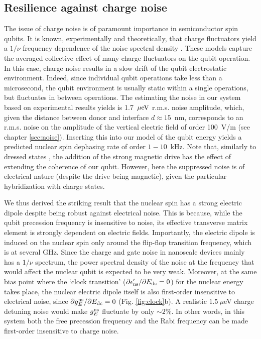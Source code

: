 \subsection{Resilience against charge noise}

The issue of charge noise is of paramount importance in semiconductor spin qubits. It is known, experimentally and theoretically, that charge fluctuators yield a $1/\nu$ frequency dependence of the noise spectral density \cite{Paladino2014}. These models capture the averaged collective effect of many charge fluctuators on the qubit operation. In this case, charge noise results in a slow drift of the qubit electrostatic environment. Indeed, since individual qubit operations take less than a microsecond, the qubit environment is usually static within a single operations, but fluctuates in between operations. The estimating the noise in our system based on experimental results yields is 1.7~${\rm \mu eV}$ r.m.s. noise amplitude, which, given the distance between donor and interface $d \approx 15$~nm, corresponds to an r.m.s. noise on the amplitude of the vertical electric field of order 100~V/m (see chapter \ref{sec:noise}). Inserting this into our model of the qubit energy yields a predicted nuclear spin dephasing rate of order $1-10$~kHz. Note that, similarly to dressed states \cite{London2013,Laucht2016,Laucht2017}, the addition of the strong magnetic drive has the effect of extending the coherence of our qubit. However, here the suppressed noise is of electrical nature (despite the drive being magnetic), given the particular hybridization with charge states.

We thus derived the striking result that the nuclear spin has a strong electric dipole despite being robust against electrical noise. This is because, while the qubit precession frequency is insensitive to noise, its effective transverse matrix element is strongly dependent on electric fields. Importantly, the electric dipole is induced on the nuclear spin  only around the flip-flop transition frequency, which is at several GHz. Since the charge and gate noise in nanoscale devices mainly has a $1/\nu$ spectrum, the power spectral density of the noise at the frequency that would affect the nuclear qubit is expected to be very weak. Moreover, at the same bias point where the `clock transition' ($\partial\epsilon'_{\rm ns}/\partial E_{\rm dc}=0$) for the nuclear energy takes place, the nuclear electric dipole itself is also first-order insensitive to electrical noise, since $\partial g_{E}^{\rm ns}/\partial E_{\rm dc}=0$ (Fig. \ref{fig:clock}b). A realistic $1.5~\mu$eV charge detuning noise \cite{Freeman2016} would make $g_{E}^{\rm ns}$ fluctuate by only $\sim2\%$. In other words, in this system both the free precession frequency and the Rabi frequency can be made first-order insensitive to charge noise.

